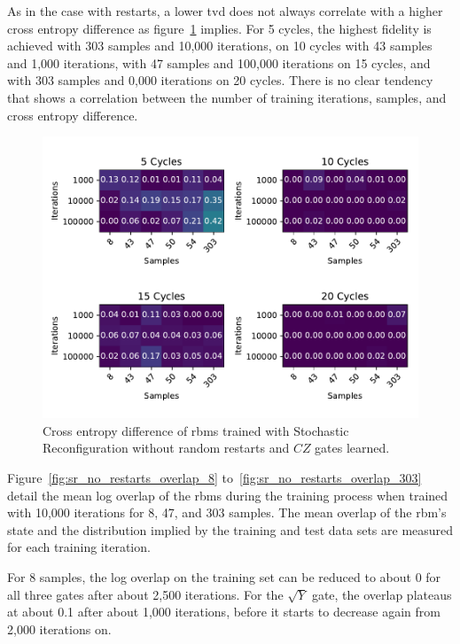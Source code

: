 As in the case with restarts, a lower \gls{tvd} does not always correlate with a higher cross entropy difference as 
figure~\ref{fig:sr_no_restarts_fxeb}
implies. For 5 cycles, the highest fidelity is achieved with 303 samples and 10,000 iterations, on 10 cycles 
with 43 samples and 1,000 iterations, with 47 samples and 100,000 iterations on 15 cycles, and with 303 samples and 
0,000 iterations on 20 cycles. There is no clear tendency that shows a correlation between 
the number of training iterations, samples, and cross entropy difference.

\begin{figure}[H]
  \centering
  \includegraphics[width=\textwidth]{figures/results/sr-no-restarts-learned/fxeb_heatmap.pdf}
  \caption[Cross Entropy Difference of RBMs Trained with Stochastic Reconfiguration without Random Restarts and $CZ$ Gates Learned]{
  Cross entropy difference of \gls{rbm}s trained with Stochastic Reconfiguration without random restarts and $CZ$ gates learned.}
  \label{fig:sr_no_restarts_fxeb}
\end{figure}

Figure~\ref{fig:sr_no_restarts_overlap_8} to~\ref{fig:sr_no_restarts_overlap_303} detail the mean log overlap of the \gls{rbm}s during the 
training process when trained with 10,000 iterations for 8, 47, and 303 samples. The 
mean overlap of the \gls{rbm}'s state and the distribution implied by the training and test data sets are measured 
for each training iteration.

For 8 samples, the log overlap on the training set can be reduced to about 0 for all three gates after about 2,500 iterations.
For the $\sqrt{Y}$ gate, the overlap plateaus at about 0.1 after about 1,000 iterations, before it starts 
to decrease again from 2,000 iterations on. 

